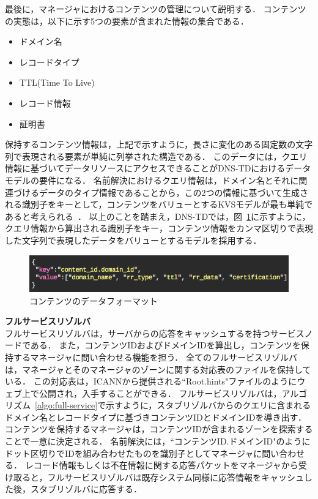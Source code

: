 \newpage
最後に，マネージャにおけるコンテンツの管理について説明する．
コンテンツの実態は，以下に示す5つの要素が含まれた情報の集合である．
\begin{itemize}
 \item ドメイン名
 \vspace{-3mm}
 \item レコードタイプ
 \vspace{-3mm}
 \item TTL(Time To Live)
 \vspace{-3mm}
 \item レコード情報
 \vspace{-3mm}
 \item 証明書
\end{itemize}
保持するコンテンツ情報は，上記で示すように，長さに変化のある固定数の文字列で表現される要素が単純に列挙された構造である．
このデータには，クエリ情報に基づいてデータリソースにアクセスできることがDNS-TDにおけるデータモデルの要件になる．
名前解決におけるクエリ情報は，ドメイン名とそれに関連づけるデータのタイプ情報であることから，この2つの情報に基づいて生成される識別子をキーとして，コンテンツをバリューとするKVSモデルが最も単純であると考えられる~\cite{Davoudian}．
以上のことを踏まえ，DNS-TDでは，図~\ref{fig:manager-provider}に示すように，クエリ情報から算出される識別子をキー，コンテンツ情報をカンマ区切りで表現した文字列で表現したデータをバリューとするモデルを採用する．
\begin{figure}[h]
 \centering
 \includegraphics[scale=0.6]{figure/content-file.png}
 \caption{コンテンツのデータフォーマット}
 \label{fig:manager-provider}
\end{figure}

\hspace{-12pt}\textbf{フルサービスリゾルバ}\\
\hspace{12pt}フルサービスリゾルバは，サーバからの応答をキャッシュするを持つサービスノードである．
また，コンテンツIDおよびドメインIDを算出し，コンテンツを保持するマネージャに問い合わせる機能を担う．
全てのフルサービスリゾルバは，マネージャとそのマネージャのゾーンに関する対応表のファイルを保持している．
この対応表は，ICANNから提供される``Root.hints"ファイルのようにウェブ上で公開され，入手することができる．
フルサービスリゾルバは，アルゴリズム~\ref{algo:full-service}で示すように，スタブリゾルバからのクエリに含まれるドメイン名とレコードタイプに基づきコンテンツIDとドメインIDを導き出す．
コンテンツを保持するマネージャは，コンテンツIDが含まれるゾーンを探索することで一意に決定される．
名前解決には，``コンテンツID.ドメインID"のようにドット区切りでIDを組み合わせたものを識別子としてマネージャに問い合わせる．
レコード情報もしくは不在情報に関する応答パケットをマネージャから受け取ると，フルサービスリゾルバは既存システム同様に応答情報をキャッシュした後，スタブリゾルバに応答する．




